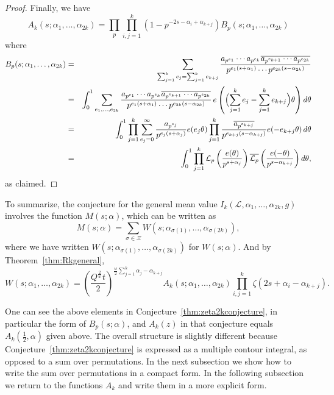 \documentclass[12pt,letterpaper]{amsart}
\theoremstyle{plain}
\theoremstyle{definition}
\theoremstyle{remark}
\numberwithin{equation}{subsection}
\numberwithin{theorem}{subsection}
\numberwithin{table}{subsection}
\def\({\left(}
\def\){\right)}
\begin{document}
\begin{proof}
Finally, we have
\begin{equation}
A_k(s;\alpha_1,\dots,\alpha_{2k})=\prod_p \prod_{i,j=1}^k
(1-p^{-2s-\alpha_i+\alpha_{k+j}})
B_p(s;\alpha_1,\dots,\alpha_{2k}) 
\end{equation}
where
\begin{eqnarray} B_p(s;\alpha_1,\dots,\alpha_{2k})&  = &
\sum_{  \sum_{j=1}^k e_j=\sum_{j=1}^k e_{k+j} }
\frac{a_{p^{e_1}}\cdots a_{p^{e_k}}
\overline{a_{p^{e_{k+1}}}\cdots a_{p^{e_{2k}}}}}
{p^{e_1(s+\alpha_1)}\cdots p^{e_{2k}(s-\alpha_{2k})}}\nonumber \\
&  = &
\int_0^1 \sum_{  e_1,\dots,e_{2k} }
\frac{a_{p^{e_1}}\cdots a_{p^{e_k}}
\overline{a_{p^{e_{k+1}}}\cdots a_{p^{e_{2k}}}}}
{p^{e_1(s+\alpha_1)}\cdots p^{e_{2k}(s-\alpha_{2k})}}
\, e\(\Bigl(\sum_{j=1}^k e_j-\sum_{j=1}^k e_{k+j}\Bigr)\theta\)  d\theta\nonumber \\
&=&\int_0^1 \prod_{j=1}^k \sum_{e_j=0}^\infty
\frac{a_{p^{e_j}}}{p^{e_j(s+\alpha_j)}}e(e_j \theta)
 \prod_{j=1}^k
\frac{\overline{a_{p^{e_{k+j}}}}}{p^{e_{k+j}(s-\alpha_{k+j})}}e(-e_{k+j}\theta)\,d\theta\nonumber
\\
&  = &\int_0^1 \prod_{j=1}^k
\mathcal{L}_p\left(\frac{e(\theta)}{p^{s+\alpha_j}}\right)
\overline{\mathcal{L}_p}\left(\frac{e(-\theta)}{p^{s-\alpha_{k+j}}}\right)
d\theta,
\end{eqnarray}
as claimed.
\end{proof}

To summarize, the conjecture for the general mean value
$I_k(\mathcal{L},\alpha_1,\dots, \alpha_{2k},g)$
involves the function $M(s;\alpha)$, which can be written as
\begin{equation}
M(s;\alpha)=
\sum_{\sigma \in \Xi}
 W(s;\alpha_{\sigma(1)},\dots ,\alpha_{\sigma(2k)}),
\end{equation}
where we have written $W(s;\alpha_{\sigma(1)},\dots ,\alpha_{\sigma(2k)})$
for $W(s;\alpha)$.
And by Theorem~\ref{thm:Rkgeneral},
\begin{equation}
 W(s;\alpha_1,\dots,\alpha_{2k})  = 
\left( \frac{Q^{\frac 2w}t}{2}
\right)^{\frac{w}{2} \sum_{j=1}^k \alpha _j-\alpha _{k+j}}
A_k(s;\alpha_1,\dots,\alpha_{2k})
\prod_{i,j=1}^k\zeta(2s+\alpha_i-\alpha_{k+j}) .
\end{equation}

One can see the above elements  in Conjecture~\ref{thm:zeta2kconjecture},
in particular the form of $B_p(s;\alpha)$, 
and $A_k(z)$ in that conjecture equals $A_k(\frac12,\alpha)$ given above. 
The overall structure is slightly different because
Conjecture~\ref{thm:zeta2kconjecture} is expressed as a multiple contour
integral, as opposed to a sum over permutations.  In the next subsection
we show how to write the sum over permutations in a compact form.
In the following subsection we return to the functions $A_k$ and write
them in a more explicit form. 
\end{document}
